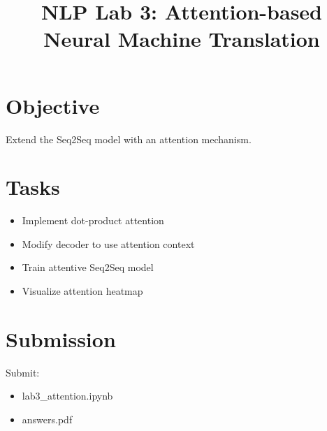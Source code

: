 \documentclass[13pt]{article}
\title{NLP Lab 3: Attention-based Neural Machine Translation}
\date{}
\begin{document}
\maketitle

\section{Objective}
Extend the Seq2Seq model with an attention mechanism.

\section{Tasks}
\begin{itemize}
\item Implement dot-product attention
\item Modify decoder to use attention context
\item Train attentive Seq2Seq model
\item Visualize attention heatmap
\end{itemize}

\section{Submission}
Submit:
\begin{itemize}
\item lab3_attention.ipynb
\item answers.pdf
\end{itemize}
\end{document}
